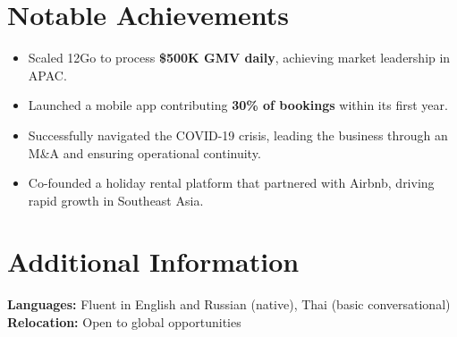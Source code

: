 \documentclass[11pt,a4paper]{article}
\begin{document}
\section*{Notable Achievements}
\begin{itemize}
    \item Scaled 12Go to process \textbf{\$500K GMV daily}, achieving market leadership in APAC.
    \item Launched a mobile app contributing \textbf{30\% of bookings} within its first year.
    \item Successfully navigated the COVID-19 crisis, leading the business through an M\&A and ensuring operational continuity.
    \item Co-founded a holiday rental platform that partnered with Airbnb, driving rapid growth in Southeast Asia.
\end{itemize}

\section*{Additional Information}
\textbf{Languages:} Fluent in English and Russian (native), Thai (basic conversational) \\
\textbf{Relocation:} Open to global opportunities
\end{document}
